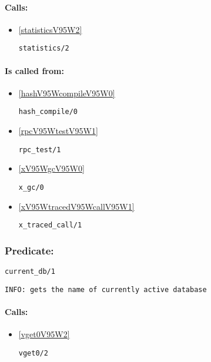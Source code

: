 \paragraph{Calls:} 
\begin{itemize}
\item \ref{statisticsV95W2} 
\begin{verbatim}
statistics/2
\end{verbatim}

\end{itemize}
\paragraph{Is called from:} 
\begin{itemize}
\item \ref{hashV95WcompileV95W0} 
\begin{verbatim}
hash_compile/0
\end{verbatim}

\item \ref{rpcV95WtestV95W1} 
\begin{verbatim}
rpc_test/1
\end{verbatim}

\item \ref{xV95WgcV95W0} 
\begin{verbatim}
x_gc/0
\end{verbatim}

\item \ref{xV95WtracedV95WcallV95W1} 
\begin{verbatim}
x_traced_call/1
\end{verbatim}

\end{itemize}

\subsubsection{Predicate:} \label{currentV95WdbV95W1}

\begin{verbatim}
current_db/1
\end{verbatim}

{\small \begin{verbatim}
INFO: gets the name of currently active database

\end{verbatim}}
\paragraph{Calls:} 
\begin{itemize}
\item \ref{vget0V95W2} 
\begin{verbatim}
vget0/2
\end{verbatim}

\end{itemize}
